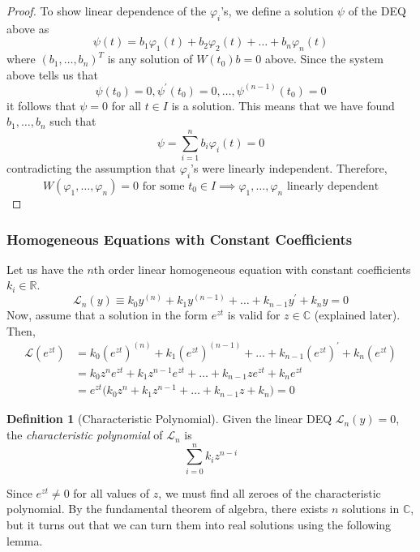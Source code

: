 \documentclass{article}
\theoremstyle{remark}
\theoremstyle{definition}
\newtheorem{definition}{Definition}[section]
\begin{document}
\begin{proof}
To show linear dependence of the $\varphi_i$'s, we define a solution $\psi$ of the DEQ above as
\[\psi (t) = b_1 \varphi_1 (t) + b_2 \varphi_2 (t) + \ldots + b_n \varphi_n (t)\]
where $(b_1, \ldots, b_n)^T$ is any solution of $W(t_0) b = 0$ above. Since the system above tells us that
\[\psi(t_0) = 0, \psi^\prime (t_0) = 0, \ldots, \psi^{(n-1)} (t_0) = 0\]
it follows that $\psi= 0$ for all $t \in I$ is a solution. This means that we have found $b_1, \ldots, b_n$ such that 
\[\psi = \sum_{i=1}^n b_i \varphi_i (t) = 0\]
contradicting the assumption that $\varphi_i$'s were linearly independent. Therefore, 
\[W(\varphi_1, \ldots, \varphi_n) = 0 \text{ for some } t_0 \in I \implies \varphi_1, \ldots, \varphi_n \text{ linearly dependent}\]
\end{proof}

\subsubsection{Homogeneous Equations with Constant Coefficients}
Let us have the $n$th order linear homogeneous equation with constant coefficients $k_i \in \mathbb{R}$. 
\[\mathcal{L}_n (y) \equiv k_0 y^{(n)} + k_1 y^{(n-1)} + \ldots + k_{n-1} y^\prime + k_n y = 0\]
Now, assume that a solution in the form $e^{zt}$ is valid for $z \in \mathbb{C}$ (explained later). Then, 
\begin{align*}
    \mathcal{L}(e^{zt}) & = k_0 (e^{zt})^{(n)} + k_1 (e^{zt})^{(n-1)} + \ldots + k_{n-1} (e^{zt})^\prime + k_n (e^{zt}) \\
    & = k_0 z^n e^{zt} + k_1 z^{n-1} e^{zt} + \ldots + k_{n-1} z e^{zt} + k_n e^{zt} \\
    & = e^{zt} \big( k_0 z^n + k_1 z^{n-1} + \ldots + k_{n-1} z + k_n \big) = 0
\end{align*}

\begin{definition}[Characteristic Polynomial]
Given the linear DEQ $\mathcal{L}_n (y) = 0$, the \textit{characteristic polynomial} of $\mathcal{L}_n$ is 
\[\sum_{i=0}^n k_i z^{n-i}\]
\end{definition}

Since $e^{zt} \neq 0$ for all values of $z$, we must find all zeroes of the characteristic polynomial. By the fundamental theorem of algebra, there exists $n$ solutions in $\mathbb{C}$, but it turns out that we can turn them into real solutions using the following lemma. 
\end{document}
